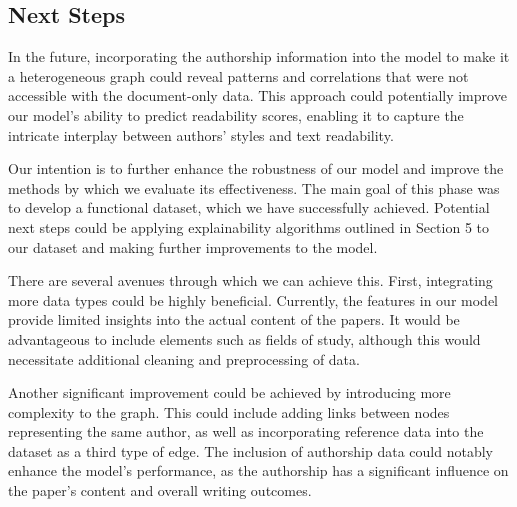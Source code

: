 \documentclass[final]{article}
\begin{document}
\subsection{Next Steps}
In the future, incorporating the authorship information into the model to make it a heterogeneous graph could reveal patterns and correlations that were not accessible with the document-only data. This approach could potentially improve our model's ability to predict readability scores, enabling it to capture the intricate interplay between authors' styles and text readability.

Our intention is to further enhance the robustness of our model and improve the methods by which we evaluate its effectiveness. The main goal of this phase was to develop a functional dataset, which we have successfully achieved. Potential next steps could be applying explainability algorithms outlined in Section 5 to our dataset and making further improvements to the model.

There are several avenues through which we can achieve this. First, integrating more data types could be highly beneficial. Currently, the features in our model provide limited insights into the actual content of the papers. It would be advantageous to include elements such as fields of study, although this would necessitate additional cleaning and preprocessing of data.

Another significant improvement could be achieved by introducing more complexity to the graph. This could include adding links between nodes representing the same author, as well as incorporating reference data into the dataset as a third type of edge. The inclusion of authorship data could notably enhance the model's performance, as the authorship has a significant influence on the paper's content and overall writing outcomes.



\clearpage

\newpage 


\end{document}

